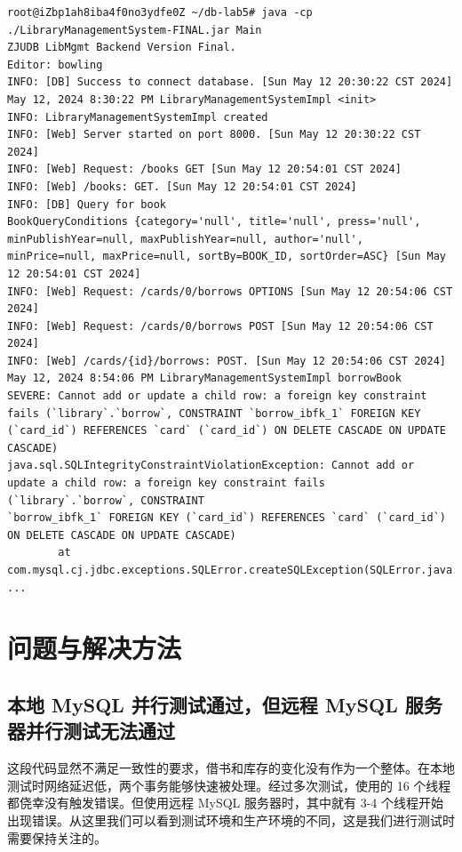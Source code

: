 \documentclass[a4paper,oneside]{ctexbook}
\begin{document}
\begin{lstlisting}[caption=日志,label=lst:log]
root@iZbp1ah8iba4f0no3ydfe0Z ~/db-lab5# java -cp ./LibraryManagementSystem-FINAL.jar Main
ZJUDB LibMgmt Backend Version Final.
Editor: bowling
INFO: [DB] Success to connect database. [Sun May 12 20:30:22 CST 2024]
May 12, 2024 8:30:22 PM LibraryManagementSystemImpl <init>
INFO: LibraryManagementSystemImpl created
INFO: [Web] Server started on port 8000. [Sun May 12 20:30:22 CST 2024]
INFO: [Web] Request: /books GET [Sun May 12 20:54:01 CST 2024]
INFO: [Web] /books: GET. [Sun May 12 20:54:01 CST 2024]
INFO: [DB] Query for book 
BookQueryConditions {category='null', title='null', press='null', minPublishYear=null, maxPublishYear=null, author='null', minPrice=null, maxPrice=null, sortBy=BOOK_ID, sortOrder=ASC} [Sun May 12 20:54:01 CST 2024]
INFO: [Web] Request: /cards/0/borrows OPTIONS [Sun May 12 20:54:06 CST 2024]
INFO: [Web] Request: /cards/0/borrows POST [Sun May 12 20:54:06 CST 2024]
INFO: [Web] /cards/{id}/borrows: POST. [Sun May 12 20:54:06 CST 2024]
May 12, 2024 8:54:06 PM LibraryManagementSystemImpl borrowBook
SEVERE: Cannot add or update a child row: a foreign key constraint fails (`library`.`borrow`, CONSTRAINT `borrow_ibfk_1` FOREIGN KEY (`card_id`) REFERENCES `card` (`card_id`) ON DELETE CASCADE ON UPDATE CASCADE)
java.sql.SQLIntegrityConstraintViolationException: Cannot add or update a child row: a foreign key constraint fails (`library`.`borrow`, CONSTRAINT 
`borrow_ibfk_1` FOREIGN KEY (`card_id`) REFERENCES `card` (`card_id`) ON DELETE CASCADE ON UPDATE CASCADE)
        at com.mysql.cj.jdbc.exceptions.SQLError.createSQLException(SQLError.java:117)
...
\end{lstlisting}

\chapter{问题与解决方法}

\section{本地 MySQL 并行测试通过，但远程 MySQL 服务器并行测试无法通过}

这段代码显然不满足一致性的要求，借书和库存的变化没有作为一个整体。在本地测试时网络延迟低，两个事务能够快速被处理。经过多次测试，使用的 16 个线程都侥幸没有触发错误。但使用远程 MySQL 服务器时，其中就有 3-4 个线程开始出现错误。从这里我们可以看到测试环境和生产环境的不同，这是我们进行测试时需要保持关注的。
\end{document}
